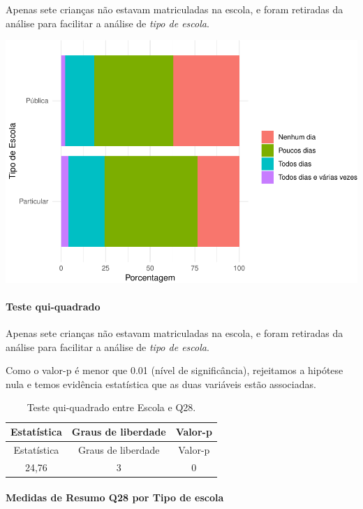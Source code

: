 \documentclass[]{article}
\let\oldparagraph\paragraph
\renewcommand{\paragraph}[1]{\oldparagraph{#1}\mbox{}}
\begin{document}
Apenas sete crianças não estavam matriculadas na escola, e foram retiradas da análise para facilitar a análise de \emph{tipo de escola}.

\begin{center}\includegraphics[width=0.75\linewidth]{relatorio_covid19_files/figure-latex/unnamed-chunk-880-1} \end{center}

\hypertarget{teste-qui-quadrado-76}{%
\paragraph{Teste qui-quadrado}\label{teste-qui-quadrado-76}}

Apenas sete crianças não estavam matriculadas na escola, e foram retiradas da análise para facilitar a análise de \emph{tipo de escola}.

Como o valor-p é menor que 0.01 (nível de significância), rejeitamos a hipótese nula e temos evidência estatística que as duas variáveis estão associadas.

\begin{longtable}[]{@{}ccc@{}}
\caption{\label{tab:unnamed-chunk-882}Teste qui-quadrado entre Escola e Q28.}\tabularnewline
\toprule
Estatística & Graus de liberdade & Valor-p\tabularnewline
\midrule
\endfirsthead
\toprule
Estatística & Graus de liberdade & Valor-p\tabularnewline
\midrule
\endhead
24,76 & 3 & 0\tabularnewline
\bottomrule
\end{longtable}

\cleardoublepage

\hypertarget{medidas-de-resumo-q28-por-tipo-de-escola}{%
\paragraph{Medidas de Resumo Q28 por Tipo de escola}\label{medidas-de-resumo-q28-por-tipo-de-escola}}
\end{document}
